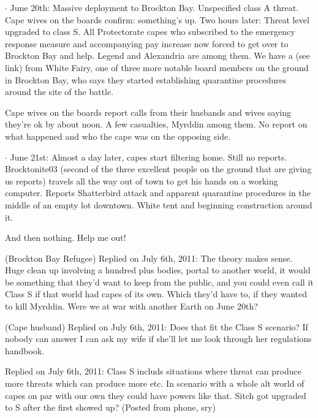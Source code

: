 $\cdot$  June 20th:  Massive deployment to Brockton Bay.  Unspecified class A threat.  Cape wives on the boards confirm: something's up.
Two hours later:  Threat level upgraded to class S.  All Protectorate capes who subscribed to the emergency response measure and accompanying pay increase now forced to get over to Brockton Bay and help.  Legend and Alexandria are among them.
We have a \underline{} (see link) from White Fairy, one of three more notable board members on the ground in Brockton Bay, who says they started establishing quarantine procedures around the site of the battle.



Cape wives on the boards report calls from their husbands and wives saying they're ok by about noon.  A few casualties, Myrddin among them.  No report on what happened and who the cape was on the opposing side.



$\cdot$  June 21st:  Almost a day later, capes start filtering home.  Still no reports.
Brocktonite03 (second of the three excellent people on the ground that are giving us reports) travels all the way out of town to get his hands on a working computer.  Reports Shatterbird attack and apparent quarantine procedures in the middle of an empty lot downtown.  White tent and beginning construction around it.



And then nothing.  Help me out!






\blacktriangleright  {}(Brockton Bay Refugee)
Replied on July 6th, 2011:
The theory makes sense.  Huge clean up involving a hundred plus bodies, portal to another world, it would be something that they'd want to keep from the public, and you could even call it Class S if that world had capes of its own.  Which they'd have to, if they wanted to kill Myrddin.  Were we at war with another Earth on June 20th?



\blacktriangleright {}(Cape husband)
Replied on July 6th, 2011:
Does that fit the Class S scenario?  If nobody can answer I can ask my wife if she'll let me look through her regulations handbook.



\blacktriangleright{}
Replied on July 6th, 2011:
Class S includs situations where threat can produce more threats which can produce more etc.  In scenario with a whole alt world of capes on par with our own they could have powers like that.  Sitch got upgraded to S after the first showed up?
(Posted from phone, sry)



